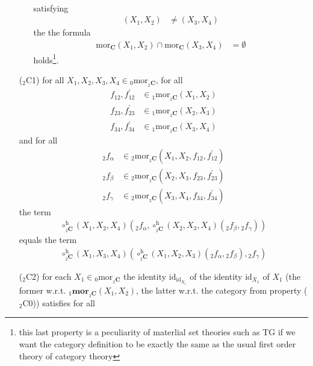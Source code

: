 \begin{enumerate}
\begin{enumerate}
\begin{align*}
\end{align*}
satisfying
\begin{align*}
  (X_{1},X_{2})
  &\neq
  (X_{3},X_{4})
\end{align*}
the the formula
\begin{align*}
  \mathrm{mor}_{\mathbf{C}}(X_{1},X_{2})
  \cap
  \mathrm{mor}_{\mathbf{C}}(X_{3},X_{4})
  &=
  \emptyset
\end{align*}
holds\footnote{this last property is a peculiarity of materlial set theories such as TG if we want the category definition to be exactly the same as the usual first order theory of category theory}.
\end{enumerate}
\item[(${}_{2}$C1)]
for all $X_{1},X_{2},X_{3},X_{4} \in {}_{0}\mathrm{mor}_{{}_{2}\mathbf{C}}$, for all
\begin{align*}
  f_{12},f_{12}^{\backprime}
  &\in
  {}_{1}\mathrm{mor}_{{}_{2}\mathbf{C}}(X_{1},X_{2})
  \\
  f_{23},f_{23}^{\backprime}
  &\in
  {}_{1}\mathrm{mor}_{{}_{2}\mathbf{C}}(X_{2},X_{3})
  \\
  f_{34},f_{34}^{\backprime}
  &\in
  {}_{1}\mathrm{mor}_{{}_{2}\mathbf{C}}(X_{3},X_{4})
\end{align*}
and for all
\begin{align*}
  {}_{2}f_{\alpha}
  &\in
  {}_{2}\mathrm{mor}_{{}_{2}\mathbf{C}}(X_{1},X_{2},f_{12},f_{12}^{\backprime})
  \\
  {}_{2}f_{\beta}
  &\in
  {}_{2}\mathrm{mor}_{{}_{2}\mathbf{C}}(X_{2},X_{3},f_{23},f_{23}^{\backprime})
  \\
  {}_{2}f_{\gamma}
  &\in
  {}_{2}\mathrm{mor}_{{}_{2}\mathbf{C}}(X_{3},X_{4},f_{34},f_{34}^{\backprime})
\end{align*}
the term
\begin{align*}
  \circ_{{}_{2}\mathbf{C}}^{\textrm{h}}
  (X_{1},X_{2},X_{4})
  \left(
    {}_{2}f_{\alpha},
    \circ_{{}_{2}\mathbf{C}}^{\textrm{h}}
    (X_{2},X_{3},X_{4})
    ({}_{2}f_{\beta},{}_{2}f_{\gamma})
  \right)
\end{align*}
equals the term
\begin{align*}
  \circ_{{}_{2}\mathbf{C}}^{\textrm{h}}
  (X_{1},X_{3},X_{4})
  \left(
    \circ_{{}_{2}\mathbf{C}}^{\textrm{h}}
    (X_{1},X_{2},X_{3})
    ({}_{2}f_{\alpha},{}_{2}f_{\beta}),
    {}_{2}f_{\gamma}
  \right)
\end{align*}
\item[(${}_{2}$C2)]
for each $X_{1} \in {}_{0}\mathrm{mor}_{{}_{2}\mathbf{C}}$ the identity $\mathrm{id}_{\mathrm{id}_{X_{1}}}$ of the identity $\mathrm{id}_{X_{1}}$ of $X_{1}$ (the former w.r.t. ${}_{1}\mathbf{mor}_{{}_{2}\mathbf{C}}(X_{1},X_{2})$, the latter w.r.t. the category from property (${}_{2}$C0)) satisfies for all

\end{enumerate}
